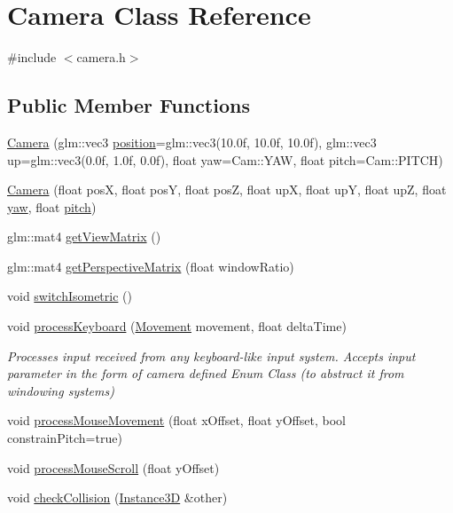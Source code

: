 \hypertarget{classCamera}{}\section{Camera Class Reference}
\label{classCamera}


{\ttfamily \#include $<$camera.\+h$>$}

\subsection*{Public Member Functions}
\begin{DoxyCompactItemize}
\item 
\hyperlink{classCamera_abffb81a503c7b170b6799a764d6b99cf}{Camera} (glm\+::vec3 \hyperlink{classCamera_a04b5db2c530d8630660e8cfb93a4b3b5}{position}=glm\+::vec3(10.\+0f, 10.\+0f, 10.\+0f), glm\+::vec3 up=glm\+::vec3(0.\+0f, 1.\+0f, 0.\+0f), float yaw=\+Cam\+::\+Y\+A\+W, float pitch=\+Cam\+::\+P\+I\+T\+C\+H)
\item 
\hyperlink{classCamera_a3537fd723fdfb5fed73a084346270cf6}{Camera} (float posX, float posY, float posZ, float upX, float upY, float upZ, float \hyperlink{classCamera_ad76701b22630f2df28a0ae15f0497a3a}{yaw}, float \hyperlink{classCamera_ab56fcb39f580e8d2159cf2c9c6d9a65a}{pitch})
\item 
glm\+::mat4 \hyperlink{classCamera_a5569ca5967e01d3344fbf6aba36d9820}{get\+View\+Matrix} ()
\item 
glm\+::mat4 \hyperlink{classCamera_af0fb989c3e781583495e50bd9f04db03}{get\+Perspective\+Matrix} (float window\+Ratio)
\item 
void \hyperlink{classCamera_adcddd44d57059dd24d9bfbc6f2260778}{switch\+Isometric} ()
\item 
void \hyperlink{classCamera_a146e9154e8593faefeb4e23a7d3d21b6}{process\+Keyboard} (\hyperlink{camera_8h_a2fc3593b03b2993ef34f3900f6be985e}{Movement} movement, float delta\+Time)
\begin{DoxyCompactList}\small\item\em Processes input received from any keyboard-\/like input system. Accepts input parameter in the form of camera defined Enum Class (to abstract it from windowing systems) \end{DoxyCompactList}\item 
void \hyperlink{classCamera_a4f07e3e1263c93781fb17b104d4f4c80}{process\+Mouse\+Movement} (float x\+Offset, float y\+Offset, bool constrain\+Pitch=true)
\item 
void \hyperlink{classCamera_a067090ee525389944ba3bacaa62f7632}{process\+Mouse\+Scroll} (float y\+Offset)
\item 
void \hyperlink{classCamera_afedb32db9693443411c939438f50b565}{check\+Collision} (\hyperlink{classInstance3D}{Instance3D} \&other)
\end{DoxyCompactItemize}
